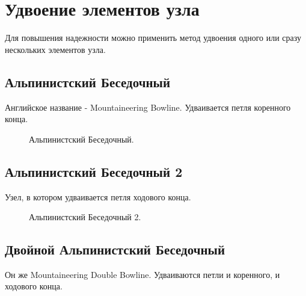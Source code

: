 \documentclass{artikel1}
\begin{document}
\section{Удвоение элементов узла}

Для повышения надежности можно применить метод удвоения одного или сразу нескольких элементов узла.

\subsection{Альпинистский Беседочный}

Английское название - Mountaineering Bowline. Удваивается петля коренного конца.

\begin{figure}[H]\centering
	\begin{minipage}{1\linewidth}
		\begin{center}
			\tcbox[enhanced jigsaw,colframe=black,opacityframe=0.5,opacityback=0.5]
			{\centering{}}
		\end{center}
	\end{minipage}
\caption{Альпинистский Беседочный.}
\label{ris:Besedochny-Mountaineering}
\end{figure}

\subsection{Альпинистский Беседочный 2}

Узел, в котором удваивается петля ходового конца.

\begin{figure}[H]\centering
	\begin{minipage}{1\linewidth}
		\begin{center}
			\tcbox[enhanced jigsaw,colframe=black,opacityframe=0.5,opacityback=0.5]
			{\centering{}}
		\end{center}
	\end{minipage}
\caption{Альпинистский Беседочный 2.}
\label{ris:Besedochny-Mountaineering-2}
\end{figure}

\subsection{Двойной Альпинистский Беседочный}

Он же Mountaineering Double Bowline. Удваиваются петли и коренного, и ходового конца.
\end{document}
